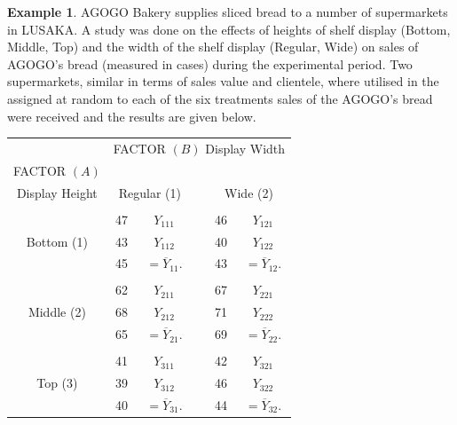 \documentclass[11pt,a4paper]{article}
\theoremstyle{definition}
\newtheorem{exa}[thm]{Example}
\begin{document}
\begin{exa}\label{res:exa:2.4.1}
AGOGO Bakery supplies sliced bread to a number of supermarkets in LUSAKA. A study was done on the effects of heights of shelf display (Bottom, Middle, Top) and the width of the shelf display (Regular, Wide) on sales of  AGOGO's bread (measured in cases) during the experimental period. Two supermarkets, similar in terms of sales value and clientele, where utilised in the assigned at random to each of the six treatments sales of the AGOGO's bread were received and the results are given below.\\


\begin{table}[h!]
\centering
\begin{tabular}{|c|ccccc|}
\hline
& \multicolumn{5}{c|}{FACTOR $(B)$ Display Width}\\
FACTOR $(A)$ &&&&&\\
Display Height & \multicolumn{2}{c}{Regular (1)}  && \multicolumn{2}{c|}{Wide (2)}\\
\hline
&&&&&\\
\multirow{3}{*}{Bottom  (1)} & 47 & $Y_{111}$ && 46 & $Y_{121}$\\
                             & 43 & $Y_{112}$ && 40 & $Y_{122}$\\
                             & 45 & $=\overline{Y}_{11}.$ && 43 & $ =\overline{Y}_{12}.$\\
\hline
&&&&&\\
\multirow{3}{*}{Middle (2)} & 62  & $Y_{211}$ && 67 & $Y_{221}$\\
                            & 68  & $Y_{212}$ && 71 & $Y_{222}$\\
                            & 65  & $=\overline{Y}_{21}.$ && 69 & $=\overline{Y}_{22}.$\\
\hline 
&&&&&\\
\multirow{3}{*}{Top (3)}   & 41   & $Y_{311}$ && 42 & $Y_{321}$\\
                           & 39   & $Y_{312}$ && 46 & $Y_{322}$\\
                           & 40   &$=\overline{Y}_{31}.$ &&  44 & $=\overline{Y}_{32}.$\\
\hline
\end{tabular}
\end{table}



\end{exa}
\end{document}
